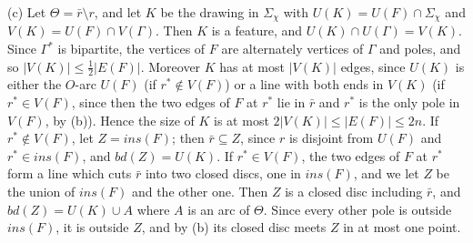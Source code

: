 {(c) Let $\Theta = \bar{r} \setminus r$, and let $K$ be the drawing in $\Sigma_\chi$ with $U(K) = U(F) \cap \Sigma_\chi$ and $V(K) = U(F) \cap V(\Gamma)$. Then $K$ is a feature, and $U(K) \cap U(\Gamma) = V(K)$. Since $\Gamma^*$ is bipartite, the vertices of $F$ are alternately vertices of $\Gamma$ and poles, and so $|V(K)| \le \frac{1}{2}|E(F)|$. Moreover $K$ has at most $|V(K)|$ edges, since $U(K)$ is either the $O$-arc $U(F)$ (if $r^* \notin V(F)$) or a line with both ends in $V(K)$ (if $r^* \in V(F)$, since then the two edges of $F$ at $r^*$ lie in $\bar{r}$ and $r^*$ is the only pole in $V(F)$, by (b)). Hence the size of $K$ is at most $2|V(K)| \le |E(F)| \le 2n$. If $r^* \notin V(F)$, let $Z = ins(F)$; then $\bar{r} \subseteq Z$, since $r$ is disjoint from $U(F)$ and $r^* \in ins(F)$, and $bd(Z) = U(K)$. If $r^* \in V(F)$, the two edges of $F$ at $r^*$ form a line which cuts $\bar{r}$ into two closed discs, one in $ins(F)$, and we let $Z$ be the union of $ins(F)$ and the other one. Then $Z$ is a closed disc including $\bar{r}$, and $bd(Z) = U(K) \cup A$ where $A$ is an arc of $\Theta$. Since every other pole is outside $ins(F)$, it is outside $Z$, and by (b) its closed disc meets $Z$ in at most one point.

}
